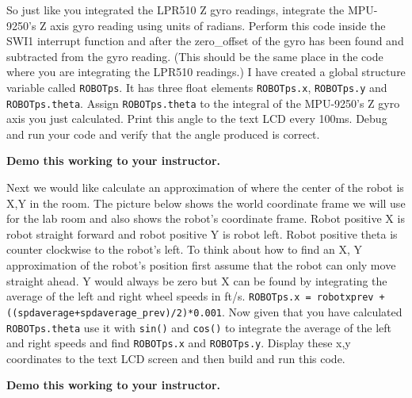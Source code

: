 \documentclass[11pt]{article}
\begin{document}
    So just like you integrated the LPR510 Z gyro readings, integrate the MPU-9250’s Z axis gyro reading using units of radians. Perform this code inside the SWI1 interrupt function and after the zero\_offset of the gyro has been found and subtracted from the gyro reading. (This should be the same place in the code where you are integrating the LPR510 readings.) I have created a global structure variable called \texttt{ROBOTps}. It has three float elements \texttt{ROBOTps.x}, \texttt{ROBOTps.y} and \texttt{ROBOTps.theta}. Assign \texttt{ROBOTps.theta} to the integral of the MPU-9250’s Z gyro axis you just calculated. Print this angle to the text LCD every 100ms. Debug and run your code and verify that the angle produced is correct.
    \begin{checkoff}
            \textbf{Demo this working to your instructor.}
    \end{checkoff}
    Next we would like calculate an approximation of where the center of the robot is X,Y in the room. The picture below shows the world coordinate frame we will use for the lab room and also shows the robot’s coordinate frame. Robot positive X is robot straight forward and robot positive Y is robot left. Robot positive theta is counter clockwise to the robot’s left. To think about how to find an X, Y approximation of the robot’s position first assume that the robot can only move straight ahead. Y would always be zero but X can be found by integrating the average of the left and right wheel speeds in ft/s. \texttt{ROBOTps.x = robotxprev + ((spdaverage+spdaverage\_prev)/2)*0.001}. Now given that you have calculated \texttt{ROBOTps.theta} use it with \texttt{sin()} and \texttt{cos()} to integrate the average of the left and right speeds and find \texttt{ROBOTps.x} and \texttt{ROBOTps.y}. Display these x,y coordinates to the text LCD screen and then build and run this code.
    \begin{checkoff}
            \textbf{Demo this working to your instructor.}
    \end{checkoff}
\end{document}
